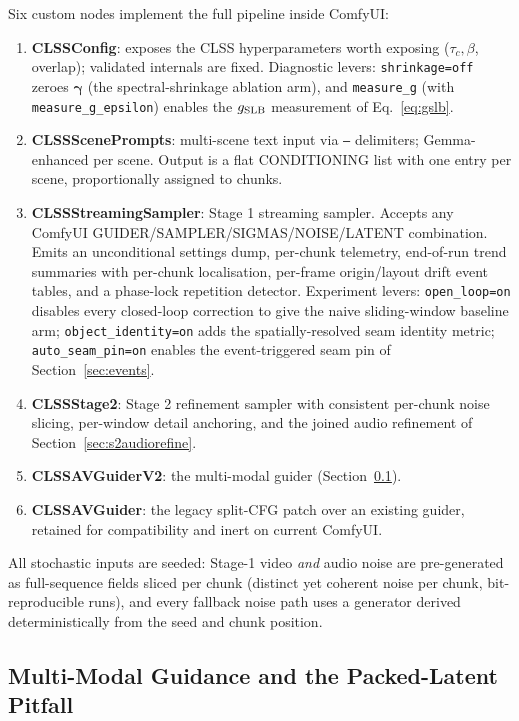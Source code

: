 \documentclass[12pt]{article}
\begin{document}
Six custom nodes implement the full pipeline inside ComfyUI:

\begin{enumerate}[leftmargin=*,noitemsep]
\item \textbf{CLSSConfig}: exposes the CLSS hyperparameters worth exposing
  ($\tau_c, \beta$, overlap); validated internals are fixed.  Diagnostic
  levers: \texttt{shrinkage=off} zeroes $\boldsymbol\gamma$ (the
  spectral-shrinkage ablation arm), and \texttt{measure\_g} (with
  \texttt{measure\_g\_epsilon}) enables the $g_{\rm SLB}$ measurement of
  Eq.~\eqref{eq:gslb}.
\item \textbf{CLSSScenePrompts}: multi-scene text input via \texttt{---}
  delimiters; Gemma-enhanced per scene.  Output is a flat CONDITIONING list
  with one entry per scene, proportionally assigned to chunks.
\item \textbf{CLSSStreamingSampler}: Stage 1 streaming sampler.  Accepts any
  ComfyUI GUIDER/SAMPLER/SIGMAS/NOISE/LATENT combination.  Emits an
  unconditional settings dump, per-chunk telemetry, end-of-run trend
  summaries with per-chunk localisation, per-frame origin/layout drift event
  tables, and a phase-lock repetition detector.  Experiment levers:
  \texttt{open\_loop=on} disables every closed-loop correction to give the
  naive sliding-window baseline arm; \texttt{object\_identity=on} adds the
  spatially-resolved seam identity metric; \texttt{auto\_seam\_pin=on}
  enables the event-triggered seam pin of Section~\ref{sec:events}.
\item \textbf{CLSSStage2}: Stage 2 refinement sampler with consistent per-chunk
  noise slicing, per-window detail anchoring, and the joined audio refinement
  of Section~\ref{sec:s2audiorefine}.
\item \textbf{CLSSAVGuiderV2}: the multi-modal guider (Section~\ref{sec:guider}).
\item \textbf{CLSSAVGuider}: the legacy split-CFG patch over an existing
  guider, retained for compatibility and inert on current ComfyUI.
\end{enumerate}

All stochastic inputs are seeded: Stage-1 video \emph{and} audio noise are
pre-generated as full-sequence fields sliced per chunk (distinct yet coherent
noise per chunk, bit-reproducible runs), and every fallback noise path uses a
generator derived deterministically from the seed and chunk position.

\subsection{Multi-Modal Guidance and the Packed-Latent Pitfall}
\label{sec:guider}
\end{document}
